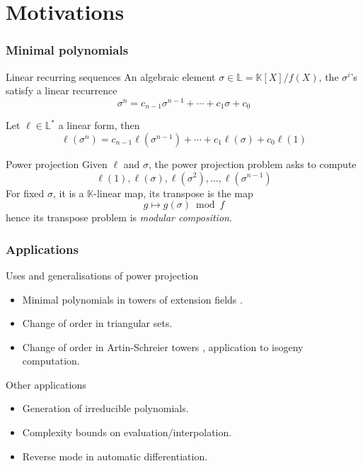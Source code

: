 \documentclass[10pt]{beamer}
\newcommand{\K}{\mathbb{K}}
\newcommand{\LK}{\mathbb{L}}
\begin{document}

\section{Motivations}

\begin{frame}
  \frametitle{Minimal polynomials \cite{Sho95}}
  
  \vspace{-1ex}

  \begin{block}{Linear recurring sequences}
    An algebraic element $\sigma\in\LK=\K[X]/f(X)$, the $\sigma^i$'s
    satisfy a linear recurrence
    \[ \sigma^n = c_{n-1} \sigma^{n-1} + \cdots + c_1\sigma + c_0\]

    Let $\ell\in\LK^\ast$ a linear form, then
    \[ \ell(\sigma^n) = c_{n-1} \ell(\sigma^{n-1}) + \cdots +
    c_1\ell(\sigma) + c_0\ell(1)\]
  \end{block}

  \vspace{-1ex}

  \begin{block}{Power projection}
    Given $\ell$ and $\sigma$, the power projection problem asks to
    compute
    \[\ell(1), \ell(\sigma), \ell(\sigma^2), \ldots, \ell(\sigma^{n-1})\]
    For fixed $\sigma$, it is a $\K$-linear map, its transpose is the map
    \[g\mapsto g(\sigma) \bmod f\]
    hence its transpose problem is \emph{modular composition}.
  \end{block}
\end{frame}


\begin{frame}
  \frametitle{Applications}

  \begin{block}{Uses and generalisations of power projection}
    \begin{itemize}
    \item Minimal polynomials in towers of extension fields \cite{Sho95}.
    \item Change of order in triangular sets.
    \item Change of order in Artin-Schreier towers \cite{DFS09},
      application to isogeny computation.
    \end{itemize}
  \end{block}

  \begin{block}{Other applications}
    \begin{itemize}
    \item Generation of irreducible polynomials.
    \item Complexity bounds on evaluation/interpolation.
    \item Reverse mode in automatic differentiation.
    \end{itemize}
  \end{block}
\end{frame}
\end{document}
